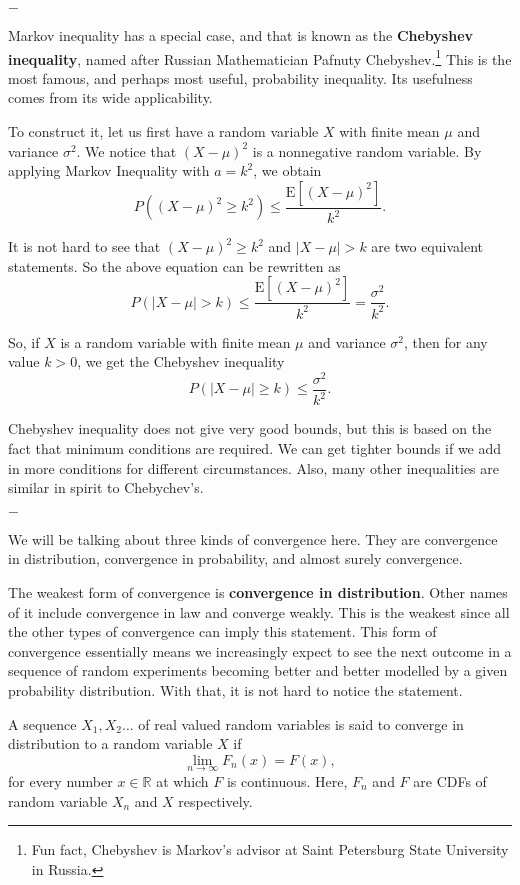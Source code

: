 \documentclass[11pt, a4paper, oneside]{book}
\theoremstyle{definition}
\newcommand{\E}[1]{\text{E}[#1]}
\def\R{\mathbb{R}}
\newcommand{\breaking}{%
    \begin{center}
    $-$
    \end{center}%
}
\begin{document}
\breaking

\noindent Markov inequality has a special case, and that is known as the \textbf{Chebyshev inequality}, named after Russian Mathematician Pafnuty Chebyshev.\footnote{Fun fact, Chebyshev is Markov's advisor at Saint Petersburg State University in Russia.} This is the most famous, and perhaps most useful, probability inequality. Its usefulness comes from its wide applicability. 

\noindent To construct it, let us first have a random variable $X$ with finite mean $\mu$ and variance $\sigma^2$. We notice that $(X - \mu)^2$ is a nonnegative random variable. By applying Markov Inequality with $a = k^2$, we obtain \[
P((X - \mu)^2 \ge k^2) \le \frac{\E{(X - \mu)^2}}{k^2}.
\]

\noindent It is not hard to see that $(X - \mu)^2 \ge k^2$ and $|X - \mu| > k$ are two equivalent statements. So the above equation can be rewritten as \[
P(|X - \mu| > k) \le \frac{\E{(X - \mu)^2}}{k^2} = \frac{\sigma^2}{k^2}.
\]

\noindent So, if $X$ is a random variable with finite mean $\mu$ and variance $\sigma^2$, then for any value $k > 0$, we get the Chebyshev inequality \[
P(|X - \mu| \ge k) \le \frac{\sigma^2}{k^2}.
\]

\noindent Chebyshev inequality does not give very good bounds, but this is based on the fact that minimum conditions are required. We can get tighter bounds if we add in more conditions for different circumstances. Also, many other inequalities are similar in spirit to Chebychev's. 

\breaking

\noindent We will be talking about three kinds of convergence here. They are convergence in distribution, convergence in probability, and almost surely convergence.

\noindent The weakest form of convergence is \textbf{convergence in distribution}. Other names of it include convergence in law and converge weakly. This is the weakest since all the other types of convergence can imply this statement. This form of convergence essentially means we increasingly expect to see the next outcome in a sequence of random experiments becoming better and better modelled by a given probability distribution. With that, it is not hard to notice the statement.

\noindent A sequence $X_1, X_2 \dots$ of real valued random variables is said to converge in distribution to a random variable $X$ if\[
\lim_{n\to \infty} F_n(x) = F(x),
\]
for every number $x\in \R$ at which $F$ is continuous. Here, $F_n$ and $F$ are CDFs of random variable $X_n$ and $X$ respectively. 
\end{document}
